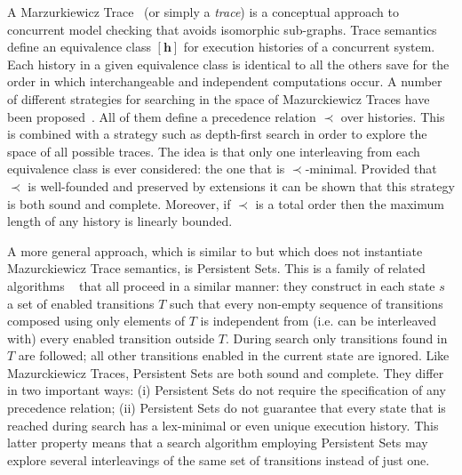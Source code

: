 A Marzurkiewicz Trace~\citep{mazurkiewicz86} (or simply a \emph{trace}) is a
conceptual approach to concurrent model checking that avoids isomorphic
sub-graphs.  Trace semantics define an equivalence class $[\mathbf h]$ for
execution histories of a concurrent system. Each history in a given
equivalence class is identical to all the others save for the order in which
interchangeable and independent computations occur.  A number of different
strategies for searching in the space of Mazurckiewicz Traces have been
proposed~\citep{esparza08}. All of them define a precedence relation $\prec$
over histories. This is combined with a strategy such as depth-first search in
order to explore the space of all possible traces.  The idea is that only one
interleaving from each equivalence class is ever considered: the one that is
$\prec$-minimal.  Provided that $\prec$ is well-founded and preserved by
extensions it can be shown that this strategy is both sound and complete.
Moreover, if $\prec$ is a total order then the maximum length of any history
is linearly bounded.

A more general approach, which is similar to but which does not instantiate
Mazurckiewicz Trace semantics, is Persistent Sets. This is a family of related
algorithms
~\citep{overman82,valmari89,godefroid91,godefroid96,wehrle12,alkhazraji12}
that all proceed in a similar manner: they construct in each state $s$ a set
of enabled transitions $T$ such that every non-empty sequence of transitions
composed using only elements of $T$ is independent from (i.e. can be
interleaved with) every enabled transition outside $T$. During search only
transitions found in $T$ are followed; all other transitions enabled in the
current state are ignored.  Like Mazurckiewicz Traces, Persistent Sets are
both sound and complete. They differ in two important ways: (i) Persistent
Sets do not require the specification of any precedence relation; (ii)
Persistent Sets do not guarantee that every state that is reached during
search has a lex-minimal or even unique execution history. This latter
property means that a search algorithm employing Persistent Sets may explore
several interleavings of the same set of transitions instead of just one.

